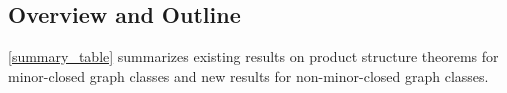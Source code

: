 \documentclass{patmorin}
\theoremstyle{plain}
\newtheorem{thm}{Theorem}
\theoremstyle{definition}
\newcommand{\defin}[1]{\textcolor{Maroon}{\emph{#1}}}
\DeclareMathOperator{\dist}{dist}
\renewcommand{\SS}{\mathcal{S}}
\renewcommand{\geq}{\geqslant}
\renewcommand{\leq}{\leqslant}
\begin{document}




\subsection{Overview and Outline}

\cref{summary_table} summarizes existing results on product structure theorems for minor-closed graph classes and new results for non-minor-closed graph classes.  
\end{document}
